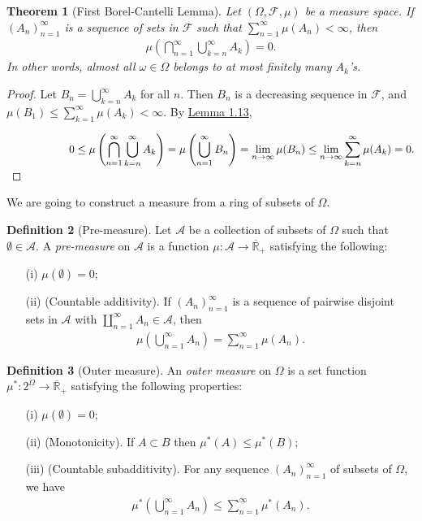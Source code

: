 \documentclass{article}
\numberwithin{equation}{section}
\theoremstyle{plain}
\newtheorem{theorem}{Theorem}[section]
\theoremstyle{definition}
\newtheorem{definition}[theorem]{Definition}
\begin{document}
\begin{theorem}[First Borel-Cantelli Lemma]\label{thm:1.14} 
Let $(\Omega,\mathscr{F},\mu)$ be a measure space. If $(A_n)_{n=1}^\infty$ is a sequence of sets in $\mathscr{F}$ such that $\sum_{n=1}^\infty \mu(A_n)<\infty$, then
\begin{align*}
	\mu\left(\bigcap_{n=1}^\infty\bigcup_{k=n}^\infty A_k\right) = 0.
\end{align*}
In other words, almost all $\omega\in\Omega$ belongs to at most finitely many $A_k$'s.
\end{theorem}
\begin{proof}
Let $B_n=\bigcup_{k=n}^\infty A_k$ for all $n$. Then $B_n$ is a decreasing sequence in $\mathscr{F}$, and $\mu(B_1)\leq\sum_{k=1}^\infty\mu(A_k)<\infty$. By \hyperref[lemma:1.13]{Lemma 1.13},\vspace{0.3cm}

$\displaystyle\hspace{2cm}0\leq\mu\left(\bigcap_{n=1}^\infty\bigcup_{k=n}^\infty A_k\right) = \mu\left(\bigcup_{n=1}^\infty B_n\right) = \lim_{n\to\infty}\mu(B_n)\leq\lim_{n\to\infty}\sum_{k=n}^\infty\mu(A_k)=0.\vspace{0.3cm}$
\end{proof}

We are going to construct a measure from a ring of subsets of $\Omega$.

\begin{definition}[Pre-measure]\label{def:1.15} Let $\mathscr{A}$ be a collection of subsets of $\Omega$ such that $\emptyset\in\mathscr{A}$. A \textit{pre-measure} on $\mathscr{A}$ is a function $\mu:\mathscr{A}\to\overline{\mathbb{R}}_+$ satisfying the following:
\begin{itemize}
	\item[(i)] $\mu(\emptyset)=0$;
	\item[(ii)] (Countable additivity). If $(A_n)_{n=1}^\infty$ is a sequence of pairwise disjoint sets in $\mathscr{A}$ with $\coprod_{n=1}^\infty A_n\in \mathscr{A}$, then
	\begin{align*}
		\mu\left(\bigcup_{n=1}^\infty A_n\right) = \sum_{n=1}^\infty \mu(A_n).
	\end{align*}
\end{itemize}
\end{definition}

\begin{definition}[Outer measure]\label{def:1.16} 
An \textit{outer measure} on $\Omega$ is a set function $\mu^*:2^\Omega\to\overline{\mathbb{R}}_+$ satisfying the following properties:
\begin{itemize}
	\item[(i)] $\mu(\emptyset)=0$;
	\item[(ii)] (Monotonicity). If $A\subset B$ then $\mu^*(A)\leq\mu^*(B)$;
	\item[(iii)] (Countable subadditivity). For any sequence $(A_n)_{n=1}^\infty$ of subsets of $\Omega$, we have
	\begin{align*}
		\mu^*\left(\bigcup_{n=1}^\infty A_n\right) \leq \sum_{n=1}^\infty \mu^*(A_n).
	\end{align*}
\end{itemize}
\end{definition}
\end{document}
